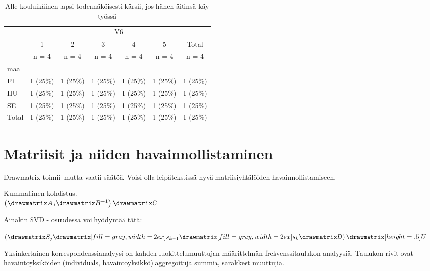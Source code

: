 \documentclass[12pt,a4paper,leqno]{article}
\theoremstyle{plain}
\theoremstyle{definition}
\theoremstyle{remark}
\begin{document}
\begin{table}[ ht ] 
\centering 
\caption{Alle kouluikäinen lapsi todennäköisesti kärsii, jos hänen äitinsä käy työssä }
\begin{tabular}{ l c c c c c c }
\hline 
 & \multicolumn{ 6 }{c}{ V6 }\\ 
  & 1 & 2 & 3 & 4 & 5 & Total \\ 
  & n = 4 & n = 4 & n = 4 & n = 4 & n = 4 & n = 4 \\ 
 \hline 
maa &   &   &   &   &   &  \\ 
\hspace{6pt}    FI & 1 (25\%) & 1 (25\%) & 1 (25\%) & 1 (25\%) & 1 (25\%) & 1 (25\%)\\ 
\hspace{6pt}    HU & 1 (25\%) & 1 (25\%) & 1 (25\%) & 1 (25\%) & 1 (25\%) & 1 (25\%)\\ 
\hspace{6pt}    SE & 1 (25\%) & 1 (25\%) & 1 (25\%) & 1 (25\%) & 1 (25\%) & 1 (25\%)\\ 
\hspace{6pt}    Total & 1 (25\%) & 1 (25\%) & 1 (25\%) & 1 (25\%) & 1 (25\%) & 1 (25\%)\\ 
 \hline
      \end{tabular}
      \end{table}  
      



\section{Matriisit ja niiden havainnollistaminen}\label{matriisikaaviot}

Drawmatrix toimii, mutta vaatii säätöä. Voisi olla leipätekstissä hyvä matriisiyhtälöiden havainnollistamiseen.

Kummallinen kohdistus. \\

$\left(
\drawmatrix A_{\hspace{0.5 mm}\vspace{0.5 mm}i}
\drawmatrix B^{-1}
\right)
\drawmatrix C$

Ainakin SVD - osuudessa voi hyödyntää tätä:


$\left(
\drawmatrix S_j
\drawmatrix[fill=gray, width=2ex]s_{k-1}
\drawmatrix[fill=gray, width=2ex]s_{k}
\drawmatrix D
\right)
\drawmatrix[height=.5]U$

Yksinkertainen korrespondenssianalyysi on kahden luokittelumuuttujan määrittelmän frekvenssitaulukon analyysiä. Taulukon rivit ovat havaintoyksiköiden (individuals, havaintoyksikkö) aggregoituja summia, sarakkeet muuttujia.\\
\end{document}
